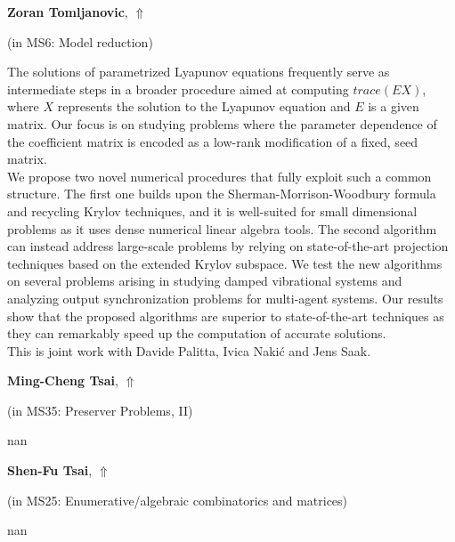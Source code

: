 \documentclass[ILAS2025-program.tex]{subfiles}
\begin{document}
     \hypertarget{down0168}{}\begin{ilasabstract}
    
    \textbf{Zoran Tomljanovic},  \hfill \hyperlink{up0168}{$\Uparrow$}
    
    (in {\color{mstitle}MS6: Model reduction})
        
        \mtskip
    The solutions of parametrized Lyapunov equations frequently serve as intermediate steps in a broader procedure aimed at computing $trace(EX)$, where $X$ represents the solution to the Lyapunov equation and $E$ is a given matrix. Our focus is on studying problems where the parameter dependence of the coefficient matrix is encoded as a low-rank modification of a fixed, seed matrix.\\
We propose two novel numerical procedures that fully exploit such a common structure. The first one builds upon the Sherman-Morrison-Woodbury   formula and recycling Krylov techniques, and it is well-suited for small dimensional problems as it uses dense numerical linear algebra tools. The second algorithm can instead address large-scale problems by relying on state-of-the-art projection techniques based on the extended Krylov subspace. We test the new algorithms on several problems arising in studying damped vibrational systems and analyzing output synchronization problems for multi-agent systems. Our results show that the proposed algorithms are superior to state-of-the-art techniques as they can remarkably speed up the computation of accurate solutions.\\
This is joint work with Davide Palitta, Ivica Naki\'{c} and Jens Saak.\end{ilasabstract}
     \hypertarget{down0281}{}\begin{ilasabstract}
    
    \textbf{Ming-Cheng Tsai},  \hfill \hyperlink{up0281}{$\Uparrow$}
    
    (in {\color{mstitle}MS35: Preserver Problems, II})
        
        \mtskip
    nan\end{ilasabstract}
     \hypertarget{down0370}{}\begin{ilasabstract}
    
    \textbf{Shen-Fu Tsai},  \hfill \hyperlink{up0370}{$\Uparrow$}
    
    (in {\color{mstitle}MS25: Enumerative/algebraic combinatorics and matrices})
        
        \mtskip
    nan\end{ilasabstract}
\end{document}
